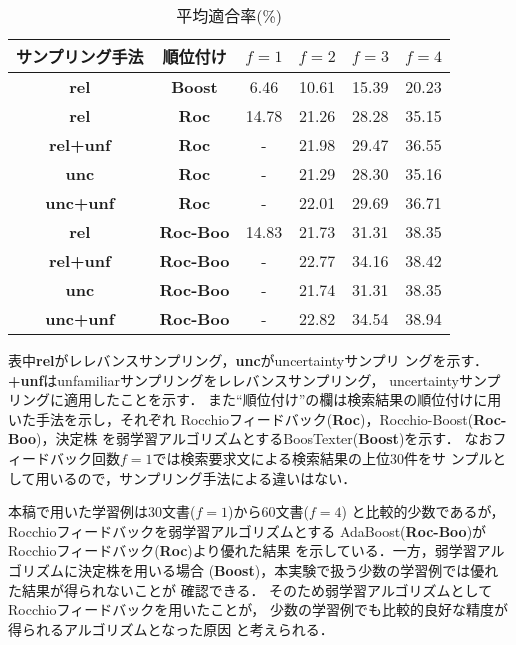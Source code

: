 \begin{table*}[tbp]
\begin{center}
\caption{平均適合率(\%)}
\begin{tabular}{c|c||c|c|c|c} \hline
サンプリング手法 & 順位付け & $f = 1$ & $f = 2$ & $f = 3$ & $f = 4$\\ \hline \hline
{\bf rel}     & {\bf Boost}  & 6.46 & 10.61 & 15.39 & 20.23 \\ \hline \hline
{\bf rel}     & {\bf Roc}    & 14.78 & 21.26 & 28.28 & 35.15 \\ \hline
{\bf rel+unf} & {\bf Roc}    & -     & 21.98 & 29.47 & 36.55 \\ \hline
{\bf unc}     & {\bf Roc}    & -     & 21.29 & 28.30 & 35.16\\ \hline
{\bf unc+unf} & {\bf Roc}    & -     & 22.01 & 29.69 & 36.71 \\ \hline \hline
{\bf rel}     & {\bf Roc-Boo} & 14.83 & 21.73 & 31.31 & 38.35 \\ \hline
{\bf rel+unf} & {\bf Roc-Boo} & -     & 22.77 & 34.16 & 38.42 \\ \hline
{\bf unc}     & {\bf Roc-Boo} & -     & 21.74 & 31.31 & 38.35 \\ \hline
{\bf unc+unf} & {\bf Roc-Boo} & -     & 22.82 & 34.54 & 38.94 \\ \hline
\end{tabular}
\label{table:NPL_n30}
\end{center}
\end{table*}

表中{\bf rel}がレレバンスサンプリング，{\bf unc}がuncertaintyサンプリ
ングを示す．{\bf +unf}はunfamiliarサンプリングをレレバンスサンプリング，
uncertaintyサンプリングに適用したことを示す．
また``順位付け''の欄は検索結果の順位付けに用いた手法を示し，それぞれ
Rocchioフィードバック({\bf Roc})，Rocchio-Boost({\bf Roc-Boo})，決定株
を弱学習アルゴリズムとするBoosTexter({\bf Boost})を示す．
なおフィードバック回数$f=1$では検索要求文による検索結果の上位30件をサ
ンプルとして用いるので，サンプリング手法による違いはない．

本稿で用いた学習例は30文書($f=1$)から60文書($f=4$)
と比較的少数であるが，Rocchioフィードバックを弱学習アルゴリズムとする
AdaBoost({\bf Roc-Boo})がRocchioフィードバック({\bf Roc})より優れた結果
を示している．一方，弱学習アルゴリズムに決定株を用いる場合
({\bf Boost})，本実験で扱う少数の学習例では優れた結果が得られないことが
確認できる．
そのため弱学習アルゴリズムとしてRocchioフィードバックを用いたことが，
少数の学習例でも比較的良好な精度が得られるアルゴリズムとなった原因
と考えられる．


